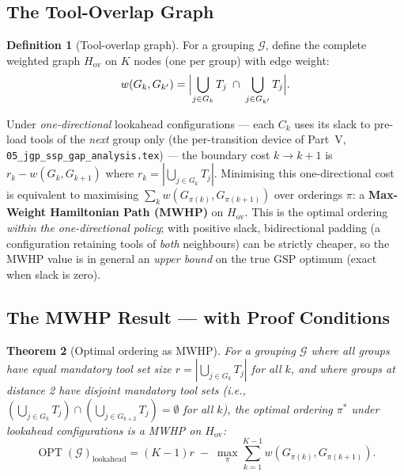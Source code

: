 \documentclass[11pt,a4paper]{article}
\theoremstyle{plain}
\newtheorem{theorem}{Theorem}[section]
\theoremstyle{definition}
\newtheorem{definition}[theorem]{Definition}
\DeclareMathOperator{\OPT}{OPT}
\newcommand{\calG}{\mathcal{G}}
\begin{document}
\subsection{The Tool-Overlap Graph}

\begin{definition}[Tool-overlap graph]
For a grouping $\calG$, define the complete weighted graph $H_\mathrm{ov}$ on $K$
nodes (one per group) with edge weight:
\[
  w(G_k, G_{k'}) = \Bigl|\bigcup_{j\in G_k}T_j \;\cap\; \bigcup_{j\in G_{k'}}T_j\Bigr|.
\]
\end{definition}

Under \emph{one-directional} lookahead configurations --- each $C_k$ uses its slack to
pre-load tools of the \emph{next} group only (the per-transition device of Part~V,
\texttt{05\_jgp\_ssp\_gap\_analysis.tex}) --- the boundary cost
$k \to k+1$ is $r_k - w(G_k, G_{k+1})$ where $r_k = |\bigcup_{j \in G_k}T_j|$.
Minimising this one-directional cost is equivalent to maximising
$\sum_k w(G_{\pi(k)}, G_{\pi(k+1)})$ over orderings $\pi$: a
\textbf{Max-Weight Hamiltonian Path (MWHP)} on $H_\mathrm{ov}$. This is the optimal
ordering \emph{within the one-directional policy}; with positive slack, bidirectional
padding (a configuration retaining tools of \emph{both} neighbours) can be strictly
cheaper, so the MWHP value is in general an \emph{upper bound} on the true GSP optimum
(exact when slack is zero).

\subsection{The MWHP Result — with Proof Conditions}

\begin{thmbox}
\begin{theorem}[Optimal ordering as MWHP]
\label{thm:mwhp}
For a grouping $\calG$ where all groups have equal mandatory tool set size
$r = |\bigcup_{j \in G_k}T_j|$ for all $k$, and where groups at distance 2
have disjoint mandatory tool sets (i.e., $(\bigcup_{j \in G_k}T_j) \cap
(\bigcup_{j \in G_{k+2}}T_j) = \emptyset$ for all $k$), the optimal ordering
$\pi^*$ under lookahead configurations is a MWHP on $H_\mathrm{ov}$:
\[
  \OPT(\calG)_{\text{lookahead}} = (K-1)r \;-\;
  \max_\pi \sum_{k=1}^{K-1} w\!\left(G_{\pi(k)}, G_{\pi(k+1)}\right).
\]
\end{theorem}
\end{thmbox}
\end{document}
